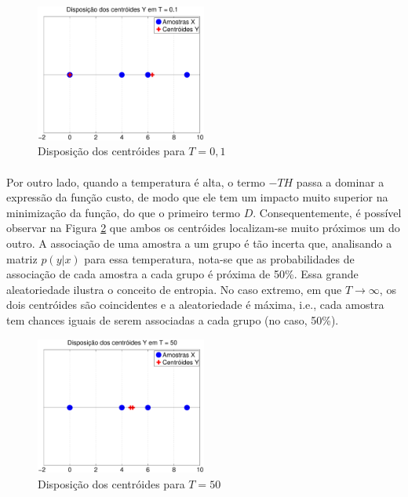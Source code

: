 \documentclass{report}
\begin{document}
\begin{figure}[H]
	\centering
	\includegraphics[width = 0.5\textwidth]{Q1_G_centroides_t_pequeno}
	\caption{Disposição dos centróides para $T = 0,1$}
	\label{disposicao_centroides_t_pequeno}
\end{figure}

\paragraph{} Por outro lado, quando a temperatura é alta, o termo $-TH$ passa a dominar a expressão da função custo, de modo que ele tem um impacto muito superior na minimização da função, do que o primeiro termo $D$. Consequentemente, é possível observar na Figura \ref{disposicao_centroides_t_grande} que ambos os centróides localizam-se muito próximos um do outro. A associação de uma amostra a um grupo é tão incerta que, analisando a matriz $p(y|x)$ para essa temperatura, nota-se que as probabilidades de associação de cada amostra a cada grupo é próxima de 50\%. Essa grande aleatoriedade ilustra o conceito de entropia. No caso extremo, em que $T \rightarrow \infty$, os dois centróides são coincidentes e a aleatoriedade é máxima, i.e., cada amostra tem chances iguais de serem associadas a cada grupo (no caso, 50\%).\\

\begin{figure}[H]
	\centering
	\includegraphics[width = 0.5\textwidth]{Q1_G_centroides_t_grande}
	\caption{Disposição dos centróides para $T = 50$}
	\label{disposicao_centroides_t_grande}
\end{figure}
\end{document}
